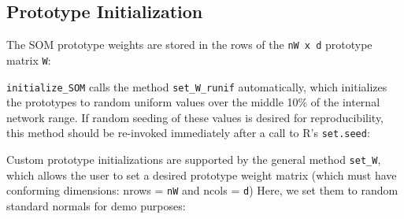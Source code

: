\documentclass[]{article}
\newenvironment{Shaded}{\begin{snugshade}}{\end{snugshade}}
\newcommand{\CommentTok}[1]{\textcolor[rgb]{0.56,0.35,0.01}{\textit{#1}}}
\newcommand{\DataTypeTok}[1]{\textcolor[rgb]{0.13,0.29,0.53}{#1}}
\newcommand{\DecValTok}[1]{\textcolor[rgb]{0.00,0.00,0.81}{#1}}
\newcommand{\KeywordTok}[1]{\textcolor[rgb]{0.13,0.29,0.53}{\textbf{#1}}}
\newcommand{\NormalTok}[1]{#1}
\newcommand{\OperatorTok}[1]{\textcolor[rgb]{0.81,0.36,0.00}{\textbf{#1}}}
\newcommand{\StringTok}[1]{\textcolor[rgb]{0.31,0.60,0.02}{#1}}
\begin{document}
\hypertarget{prototype-initialization}{%
\subsection{Prototype Initialization}\label{prototype-initialization}}

The SOM prototype weights are stored in the rows of the \texttt{nW\ x\ d} prototype matrix \texttt{W}:

\begin{Shaded}
\end{Shaded}

\texttt{initialize\_SOM} calls the method \texttt{set\_W\_runif} automatically, which initializes the prototypes to random uniform values over the middle 10\% of the internal network range. If random seeding of these values is desired for reproducibility, this method should be re-invoked immediately after a call to R's \texttt{set.seed}:

\begin{Shaded}
\end{Shaded}

Custom prototype initializations are supported by the general method \texttt{set\_W}, which allows the user to set a desired prototype weight matrix (which must have conforming dimensions: nrows = \texttt{nW} and ncols = \texttt{d}) Here, we set them to random standard normals for demo purposes:

\begin{Shaded}
\end{Shaded}
\end{document}
